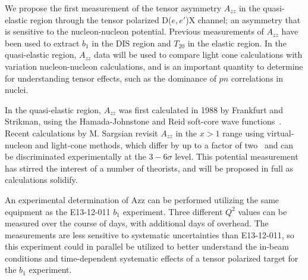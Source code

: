 We propose the first measurement of the tensor asymmetry $A_{zz}$ in the quasi-elastic region through the tensor polarized D($e,e'$)X channel; an asymmetry that is sensitive to the nucleon-nucleon potential.  Previous measurements of $A_{zz}$ have been used to extract $b_1$ in the DIS region and $T_{20}$ in the elastic region. In the quasi-elastic region, $A_{zz}$ data will be used to compare light cone calculations with variation nucleon-nucleon calculations, and is an important quantity to determine for understanding tensor effects, such as the dominance of $pn$ correlations in nuclei.

In the quasi-elastic region, $A_{zz}$ was first calculated in 1988 by Frankfurt and Strikman, using the Hamada-Johnstone and Reid soft-core wave functions~\cite{Frankfurt:1988nt}. Recent calculations by
M. Sargsian revisit $A_{zz}$ in the $x > 1$ range using virtual-nucleon and light-cone methods, which differ by up to a factor of two~\cite{MISAK} and can be discriminated experimentally at the $3-6\sigma$ level. This potential measurement has stirred the interest of a number of theorists, and will be proposed in full as calculations solidify.

An experimental determination of Azz can be performed utilizing the same equipment as the E13-12-011 $b_1$ experiment.  Three different $Q^2$ values can be measured over the course of \productiondays days, with \overheaddays additional days of overhead. The measurements are less sensitive to systematic uncertainties than E13-12-011, so this experiment could in parallel be utilized to better understand the in-beam conditions and time-dependent systematic effects of a tensor polarized target for the $b_1$ experiment.





